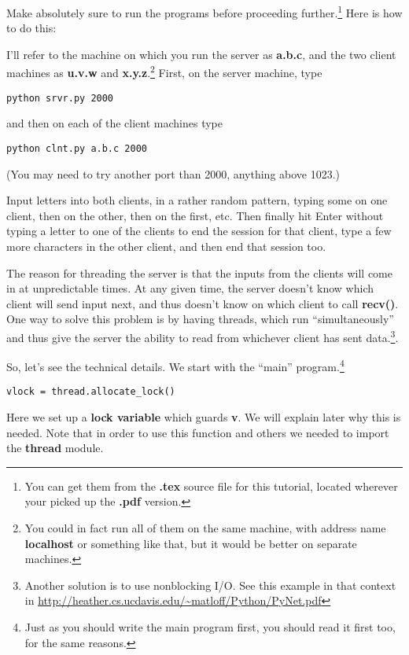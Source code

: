 Make absolutely sure to run the programs before proceeding
further.\footnote{You can get them from the {\bf .tex} source file for
this tutorial, located wherever your picked up the {\bf .pdf} version.}
Here is how to do this:  

I'll refer to the machine on which you run the server as {\bf a.b.c},
and the two client machines as {\bf u.v.w} and {\bf x.y.z}.\footnote{You
could in fact run all of them on the same machine, with address name
{\bf localhost} or something like that, but it would be better on
separate machines.}  First, on the server machine, type

\begin{verbatim}
python srvr.py 2000
\end{verbatim}

and then on each of the client machines type

\begin{verbatim}
python clnt.py a.b.c 2000
\end{verbatim}

(You may need to try another port than 2000, anything above 1023.)

Input letters into both clients, in a rather random pattern, typing some
on one client, then on the other, then on the first, etc.  Then finally
hit Enter without typing a letter to one of the clients to end the
session for that client, type a few more characters in the other client,
and then end that session too.

The reason for threading the server is that the inputs from the clients
will come in at unpredictable times.  At any given time, the server
doesn't know which client will send input next, and thus doesn't know on
which client to call {\bf recv()}.  One way to solve this problem is by
having threads, which run ``simultaneously'' and thus give the server
the ability to read from whichever client has sent data.\footnote{Another 
solution is to use nonblocking I/O.  See this example in that context in
\url{http://heather.cs.ucdavis.edu/~matloff/Python/PyNet.pdf}}.  

So, let's see the technical details.  We start with the ``main''
program.\footnote{Just as you should write the main program first, you
should read it first too, for the same reasons.}

\begin{Verbatim}[fontsize=\relsize{-2}]
vlock = thread.allocate_lock()  
\end{Verbatim}

Here we set up a {\bf lock variable} which guards {\bf
v}.  We will explain later why this is needed.  Note that in order to
use this function and others we needed to import the {\bf thread}
module.

